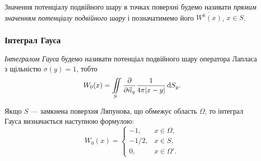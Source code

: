 \begin{definition}
	Значення потенціалу подвійного шару в точках поверхні будемо називати \textit{прямим значенням потенціалу подвійного шару} і позначатимемо його $\overline{W^k(x)}$, $x \in S$.
\end{definition}

\subsubsection{Інтеграл Гауса}

\begin{definition}
	\textit{Інтегралом Гауса} будемо називати потенціал подвійного шару оператора Лапласа з щільністю $\sigma(y) = 1$, тобто
	\begin{equation}
		W_0(x) = \displaystyle\iint\limits_S \frac{\partial}{\partial \vec n_y} \frac{1}{4 \pi |x - y|} \mathop{}\!\mathrm{d} S_y.
	\end{equation}
\end{definition}

\begin{lemma}
	Якщо $S$ --- замкнена поверхня Ляпунова, що обмежує область $\Omega$, то інтеграл Гауса визначається наступною формулою:
	\begin{equation}
		W_0(x) = \begin{cases}
			-1, & x \in \Omega, \\
			-1/2, & x \in S, \\
			0, & x \in \Omega'.
		\end{cases}
	\end{equation}
\end{lemma}


